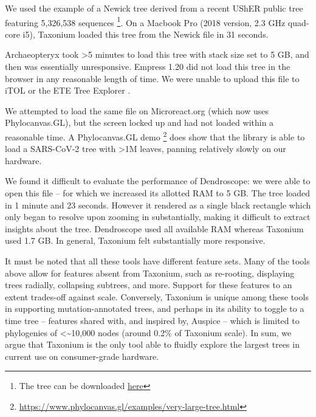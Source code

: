 We used the example of a Newick tree derived from a recent UShER public tree \citep{McBroome2021} featuring 5,326,538 sequences \footnote{The tree can be downloaded \href{https://hgwdev.gi.ucsc.edu/~angie/UShER\_SARS-CoV-2/2022/05/17/public-2022-05-17.all.nwk.gz}{here}}. On a Macbook Pro (2018 version, 2.3 GHz quad-core i5), Taxonium loaded this tree from the Newick file in 31 seconds. 

Archaeopteryx \citep{archaeopteryx} took >5 minutes to load this tree with stack size set to 5 GB, and then was essentially unresponsive. Empress 1.20 \citep{CantrellFedarko2021empress} did not load this tree in the browser in any reasonable length of time. We were unable to upload this file to iTOL \citep{itol} or the ETE Tree Explorer \citep{ete}.

We attempted to load the same file on Microreact.org \citep{argimon2016microreact} (which now uses Phylocanvas.GL), but the screen locked up and had not loaded within a reasonable time. A Phylocanvas.GL demo \footnote{\url{https://www.phylocanvas.gl/examples/very-large-tree.html}} does show that the library \citep{abudahab2021phylocanvas} is able to load a SARS-CoV-2 tree with >1M leaves, panning relatively slowly on our hardware.

We found it difficult to evaluate the performance of Dendroscope: we were able to open this file -- for which we increased its allotted RAM to 5 GB. The tree loaded in 1 minute and 23 seconds. However it rendered as a single black rectangle which only began to resolve upon zooming in substantially, making it difficult to extract insights about the tree. Dendroscope used all available RAM whereas Taxonium used 1.7 GB. In general, Taxonium felt substantially more responsive.


It must be noted that all these tools have different feature sets. Many of the tools above allow for features absent from Taxonium, such as re-rooting, displaying trees radially, collapsing subtrees, and more. Support for these features to an extent trades-off against scale. Conversely, Taxonium is unique among these tools in supporting mutation-annotated trees, and perhaps in its ability to toggle to a time tree -- features shared with, and inspired by, Auspice \citep{nextstrain} -- which is limited to phylogenies of <\textasciitilde10,000 nodes (around 0.2\% of  Taxonium scale). In sum, we argue that Taxonium is the only tool able to fluidly explore the largest trees in current use on consumer-grade hardware.



